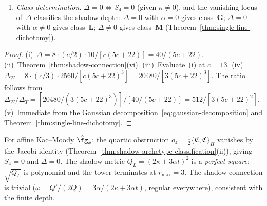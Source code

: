 \begin{corollary}
\begin{enumerate}[label=\textup{(\roman*)}]
\item \emph{Class determination.}\enspace
  $\Delta = 0 \iff S_4 = 0$ \textup{(}given $\kappa \neq 0$\textup{)},
  and the vanishing locus of~$\Delta$ classifies the shadow depth:
  $\Delta = 0$ with $\alpha = 0$ gives class~$\mathbf{G}$;
  $\Delta = 0$ with $\alpha \neq 0$ gives class~$\mathbf{L}$;
  $\Delta \neq 0$ gives class~$\mathbf{M}$
  \textup{(}Theorem~\textup{\ref{thm:single-line-dichotomy}}\textup{)}.
\end{enumerate}
\end{corollary}

\begin{proof}
(i)~$\Delta = 8 \cdot (c/2) \cdot 10/[c(5c{+}22)]
= 40/(5c{+}22)$.
(ii)~Theorem~\ref{thm:shadow-connection}(vi).
(iii)~Evaluate~(i) at $c = 13$.
(iv)~$\Delta_W = 8 \cdot (c/3) \cdot 2560/[c(5c{+}22)^3]
= 20480/[3(5c{+}22)^3]$.
The ratio follows from
$\Delta_W/\Delta_T
= [20480/(3(5c{+}22)^3)] / [40/(5c{+}22)]
= 512/[3(5c{+}22)^2]$.
(v)~Immediate from the Gaussian
decomposition~\eqref{eq:gaussian-decomposition}
and Theorem~\ref{thm:single-line-dichotomy}.
\end{proof}

\begin{remark}
\label{rem:affine-shadow-metric}
For affine Kac--Moody $\hat{\fg}_k$: the quartic obstruction $o_4 = \frac{1}{2}\{\mathfrak{C},\mathfrak{C}\}_H$ vanishes by the Jacobi identity (Theorem~\ref{thm:shadow-archetype-classification}(ii)), giving $S_4 = 0$ and $\Delta = 0$.  The shadow metric $Q_L = (2\kappa + 3\alpha t)^2$ is a \emph{perfect square}: $\sqrt{Q_L}$ is polynomial and the tower terminates at $r_{\max} = 3$.  The shadow connection is trivial ($\omega = Q'/(2Q) = 3\alpha/(2\kappa+3\alpha t)$, regular everywhere), consistent with the finite depth.
\end{remark}

